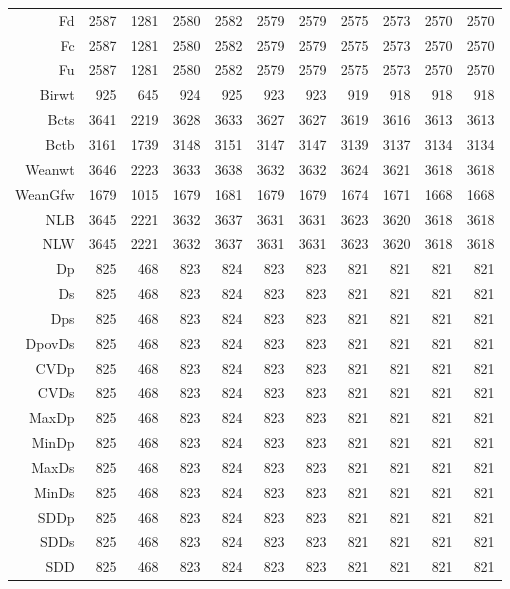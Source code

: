 \begin{table}[p]
\begin{tabular}{rrrrrrrrrrr}
  Fd & 2587 & 1281 & 2580 & 2582 & 2579 & 2579 & 2575 & 2573 & 2570 & 2570 \\ 
  Fc & 2587 & 1281 & 2580 & 2582 & 2579 & 2579 & 2575 & 2573 & 2570 & 2570 \\ 
  Fu & 2587 & 1281 & 2580 & 2582 & 2579 & 2579 & 2575 & 2573 & 2570 & 2570 \\ 
  Birwt & 925 & 645 & 924 & 925 & 923 & 923 & 919 & 918 & 918 & 918 \\ 
  Bcts & 3641 & 2219 & 3628 & 3633 & 3627 & 3627 & 3619 & 3616 & 3613 & 3613 \\ 
  Bctb & 3161 & 1739 & 3148 & 3151 & 3147 & 3147 & 3139 & 3137 & 3134 & 3134 \\ 
  Weanwt & 3646 & 2223 & 3633 & 3638 & 3632 & 3632 & 3624 & 3621 & 3618 & 3618 \\ 
  WeanGfw & 1679 & 1015 & 1679 & 1681 & 1679 & 1679 & 1674 & 1671 & 1668 & 1668 \\ 
  NLB & 3645 & 2221 & 3632 & 3637 & 3631 & 3631 & 3623 & 3620 & 3618 & 3618 \\ 
  NLW & 3645 & 2221 & 3632 & 3637 & 3631 & 3631 & 3623 & 3620 & 3618 & 3618 \\ 
  Dp & 825 & 468 & 823 & 824 & 823 & 823 & 821 & 821 & 821 & 821 \\ 
  Ds & 825 & 468 & 823 & 824 & 823 & 823 & 821 & 821 & 821 & 821 \\ 
  Dps & 825 & 468 & 823 & 824 & 823 & 823 & 821 & 821 & 821 & 821 \\ 
  DpovDs & 825 & 468 & 823 & 824 & 823 & 823 & 821 & 821 & 821 & 821 \\ 
  CVDp & 825 & 468 & 823 & 824 & 823 & 823 & 821 & 821 & 821 & 821 \\ 
  CVDs & 825 & 468 & 823 & 824 & 823 & 823 & 821 & 821 & 821 & 821 \\ 
  MaxDp & 825 & 468 & 823 & 824 & 823 & 823 & 821 & 821 & 821 & 821 \\ 
  MinDp & 825 & 468 & 823 & 824 & 823 & 823 & 821 & 821 & 821 & 821 \\ 
  MaxDs & 825 & 468 & 823 & 824 & 823 & 823 & 821 & 821 & 821 & 821 \\ 
  MinDs & 825 & 468 & 823 & 824 & 823 & 823 & 821 & 821 & 821 & 821 \\ 
  SDDp & 825 & 468 & 823 & 824 & 823 & 823 & 821 & 821 & 821 & 821 \\ 
  SDDs & 825 & 468 & 823 & 824 & 823 & 823 & 821 & 821 & 821 & 821 \\ 
  SDD & 825 & 468 & 823 & 824 & 823 & 823 & 821 & 821 & 821 & 821 \\ 

\end{tabular}
\end{table}
